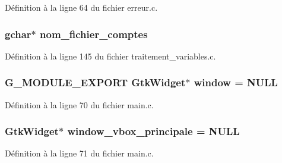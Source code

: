 Définition à la ligne 64 du fichier erreur.c.

\subsubsection[{nom\_\-fichier\_\-comptes}]{\setlength{\rightskip}{0pt plus 5cm}gchar$\ast$ {\bf nom\_\-fichier\_\-comptes}}\label{main_8c_ae00b9af94c75169e6ab8cf0ec25e8b89}


Définition à la ligne 145 du fichier traitement\_\-variables.c.

\subsubsection[{window}]{\setlength{\rightskip}{0pt plus 5cm}G\_\-MODULE\_\-EXPORT GtkWidget$\ast$ {\bf window} = NULL}\label{main_8c_a8ddeaad103b5b4baa1b4fe44e09fe817}


Définition à la ligne 70 du fichier main.c.

\subsubsection[{window\_\-vbox\_\-principale}]{\setlength{\rightskip}{0pt plus 5cm}GtkWidget$\ast$ {\bf window\_\-vbox\_\-principale} = NULL}\label{main_8c_a4cd02f5b03ca212e8af64fcf0c03cef5}


Définition à la ligne 71 du fichier main.c.

